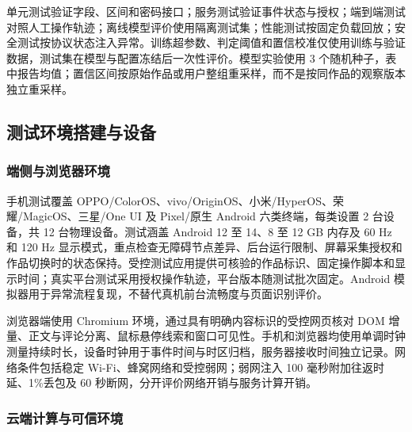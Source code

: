 单元测试验证字段、区间和密码接口；服务测试验证事件状态与授权；端到端测试对照人工操作轨迹；离线模型评价使用隔离测试集；性能测试按固定负载回放；安全测试按协议状态注入异常。训练超参数、判定阈值和置信校准仅使用训练与验证数据，测试集在模型与配置冻结后一次性评价。模型实验使用 3 个随机种子，表中报告均值；置信区间按原始作品或用户整组重采样，而不是按同作品的观察版本独立重采样。

\subsection{测试环境搭建与设备}\label{section:3.2}

\subsubsection{端侧与浏览器环境}\label{section:3.2.1}

手机测试覆盖 OPPO/ColorOS、vivo/OriginOS、小米/HyperOS、荣耀/MagicOS、三星/One UI 及 Pixel/原生 Android 六类终端，每类设置 2 台设备，共 12 台物理设备。测试涵盖 Android 12 至 14、8 至 12 GB 内存及 60 Hz 和 120 Hz 显示模式，重点检查无障碍节点差异、后台运行限制、屏幕采集授权和作品切换时的状态保持。受控测试应用提供可核验的作品标识、固定操作脚本和显示时间；真实平台测试采用授权操作轨迹，平台版本随测试批次固定。Android 模拟器用于异常流程复现，不替代真机前台流畅度与页面识别评价。

浏览器端使用 Chromium 环境，通过具有明确内容标识的受控网页核对 DOM 增量、正文与评论分离、鼠标悬停线索和窗口可见性。手机和浏览器均使用单调时钟测量持续时长，设备时钟用于事件时间与时区归档，服务器接收时间独立记录。网络条件包括稳定 Wi-Fi、蜂窝网络和受控弱网；弱网注入 100 毫秒附加往返时延、1\%丢包及 60 秒断网，分开评价网络开销与服务计算开销。

\subsubsection{云端计算与可信环境}\label{section:3.2.2}

